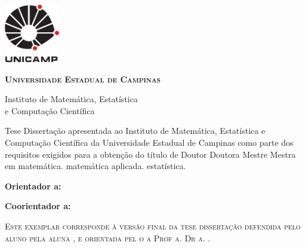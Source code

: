 \thispagestyle{plain}
\includegraphics[width=.94in, height=1in,
keepaspectratio=true]{pdfimgs/unicamp-logo}
\begin{center}
  {\large\textbf{\textsc{Universidade Estadual de Campinas}}
  \vspace{.5cm}

  Instituto de Matemática, Estatística \\
  e Computação Científica}
\end{center}
\vfill
\begin{center}
  {\large\textbf{\textsc{\autor}}}
\end{center}
\vfill
\begin{center}
  {\Large\textbf{\textsc{\titulo}}}
\end{center}
\vfill

\begin{flushright}
  \begin{minipage}[c]{.5\textwidth}
    \ifx\mestrado\undefined
    Tese
    \else
    Dissertação
    \fi
    apresentada ao Instituto de Matemática,
    Estatística e Computação Científica da Universidade
    Estadual de Campinas como parte dos requisitos exigidos
    para a obtenção do título de
    \ifx\mestrado\undefined
    \ifx\femaleAuthor\undefined
    Doutor
    \else
    Doutora
    \fi
    \else
    \ifx\femaleAuthor\undefined
    Mestre
    \else
    Mestra
    \fi
    \fi
    em
    \ifx\matematica\undefined
    \else
    matemática.
    \fi
    \ifx\aplicada\undefined
    \else
    matemática aplicada.
    \fi
    \ifx\estatistica\undefined
    \else
    estatística.
    \fi
  \end{minipage}
\end{flushright}
\vspace{.5cm}

\noindent
\textbf{Orientador\ifx\femaleOrientador\undefined
\else
a\fi: \orientador
}
\vspace{.25cm}

\ifx\coorientador\undefined
\else
\noindent
\textbf{Coorientador\ifx\femaleCoorientador\undefined
\else
a\fi: \coorientador
}
\vspace{.5cm}
\fi

\noindent
\begin{minipage}[c]{.5\textwidth}
  {\footnotesize\textsc{Este exemplar corresponde à versão final da
  \ifx\mestrado\undefined
  tese
  \else
  dissertação
  \fi
  defendida
  \ifx\femaleAuthor\undefined
  pelo aluno
  \else
  pela aluna
  \fi
  \autor,
  e orientada pel\ifx\femaleOrientador\undefined
  o\else
  a\fi{} Prof\ifx\femaleOrientador\undefined
  \else
  a\fi. Dr\ifx\femaleOrientador\undefined
  \else
  a\fi. \orientador.
  }}
\end{minipage}
\vspace{1cm}


